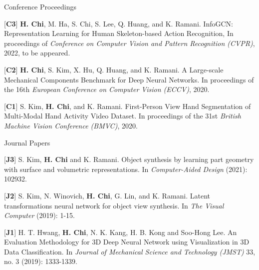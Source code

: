 


\begin{cventries}
\cvpub
{Conference Proceedings} %
{ %
\begin{cvitems}
\item {[\textbf{C3}] \textbf{H. Chi}, M. Ha, S. Chi, S. Lee, Q. Huang, and K. Ramani. InfoGCN: Representation Learning for Human Skeleton-based Action Recognition, In proceedings of \textit{Conference on Computer Vision and Pattern Recognition (CVPR)}, 2022, to be appeared.}
\item {[\textbf{C2}] \textbf{H. Chi}, S. Kim, X. Hu, Q. Huang, and K. Ramani. A Large-scale Mechanical Components Benchmark for Deep Neural Networks. In proceedings of the 16th \textit{European Conference on Computer Vision (ECCV)}, 2020.}
\item {[\textbf{C1}] S. Kim, \textbf{H. Chi}, and K. Ramani. First-Person View Hand Segmentation of Multi-Modal Hand Activity Video Dataset. In proceedings of the 31st \textit{British Machine Vision Conference (BMVC)}, 2020.}
\end{cvitems}
}


\cvpub
{Journal Papers} %
{ %
\begin{cvitems}
\item {[\textbf{J3}] S. Kim, \textbf{H. Chi} and K. Ramani. Object synthesis by learning part geometry with surface and volumetric representations. In \textit{Computer-Aided Design} (2021): 102932.}
\item {[\textbf{J2}] S. Kim, N. Winovich, \textbf{H. Chi}, G. Lin, and K. Ramani. Latent transformations neural network for object view synthesis. In \textit{The Visual Computer} (2019): 1-15.}
\item {[\textbf{J1}] H. T. Hwang, \textbf{H. Chi}, N. K. Kang, H. B. Kong and Soo-Hong Lee. An Evaluation Methodology for 3D Deep Neural Network using Visualization in 3D Data Classification. In \textit{Journal of Mechanical Science and Technology (JMST)} 33, no. 3 (2019): 1333-1339.}
\end{cvitems}
}


\end{cventries}
